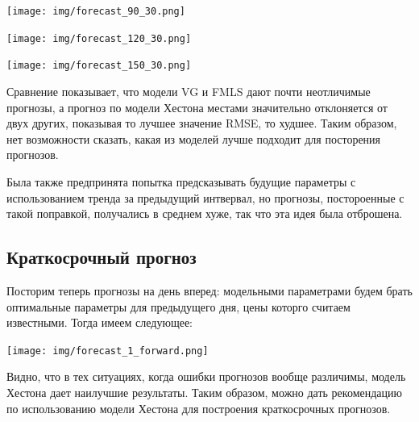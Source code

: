\documentclass[oneside, final, 12pt, a4paper]{article}
\begin{document}
\begin{center}
  \texttt{[image: img/forecast\_90\_30.png]}
\end{center}
\begin{center}
  \texttt{[image: img/forecast\_120\_30.png]}
\end{center}

\begin{center}
  \texttt{[image: img/forecast\_150\_30.png]}
\end{center}

Сравнение показывает, что модели VG и FMLS дают почти неотличимые прогнозы, а прогноз по модели Хестона местами значительно отклоняется от двух других, показывая то лучшее значение RMSE, то худшее. Таким образом, нет возможности сказать, какая из моделей лучше подходит для посторения прогнозов.

Была также предпринята попытка предсказывать будущие параметры с использованием тренда за предыдущий интвервал, но прогнозы, постороенные с такой поправкой, получались в среднем хуже, так что эта идея была отброшена.


\newpage
\subsection{Краткосрочный прогноз}
Посторим теперь прогнозы на день вперед: модельными параметрами будем брать оптимальные параметры для предыдущего дня, цены которго считаем известными. Тогда имеем следующее:

\begin{center}
  \texttt{[image: img/forecast\_1\_forward.png]}
\end{center}

Видно, что в тех ситуациях, когда ошибки прогнозов вообще различимы, модель Хестона дает наилучшие результаты. Таким образом, можно дать рекомендацию по использованию модели Хестона для построения краткосрочных прогнозов.


\newpage
\end{document}

